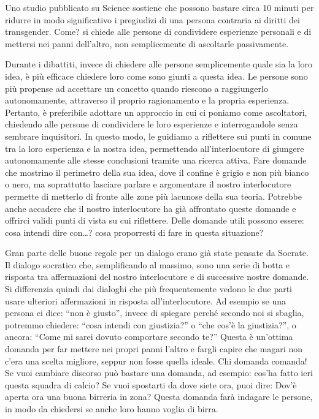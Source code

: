 \documentclass[12pt]{book} %
\begin{document}
Uno studio pubblicato su Science sostiene che
possono bastare circa 10 minuti per ridurre in modo significativo i pregiudizi di una persona contraria ai diritti dei transgender. Come? si chiede alle persone di condividere esperienze personali e di mettersi nei panni dell’altro, non semplicemente di ascoltarle passivamente.

Durante i dibattiti, invece di chiedere alle persone semplicemente quale sia la loro idea, è più efficace chiedere loro
come sono giunti a questa idea. Le persone sono più propense ad accettare un concetto quando riescono a raggiungerlo
autonomamente, attraverso il proprio ragionamento e la propria esperienza. Pertanto, è preferibile adottare un
approccio in cui ci poniamo come ascoltatori, chiedendo alle persone di condividere le loro esperienze e interrogandole
senza sembrare inquisitori. In questo modo, le guidiamo a riflettere sui punti in comune tra la loro esperienza e la
nostra idea, permettendo all'interlocutore di giungere autonomamente alle stesse conclusioni tramite una ricerca
attiva. Fare domande che mostrino il perimetro della sua idea, dove il confine è grigio e non più bianco o nero, ma
soprattutto lasciare parlare e argomentare il nostro interlocutore permette di metterlo di fronte alle zone più
lacunose della sua teoria. Potrebbe anche accadere che il
nostro interlocutore ha già affrontato queste domande e offrirci validi punti di vista su cui riflettere. Delle domande
utili possono essere: cosa intendi dire con…? cosa proporresti di fare in questa situazione?

Gran parte delle buone regole per un dialogo erano già state pensate da Socrate. Il dialogo socratico che, 
semplificando al massimo, sono una serie di botta e risposta tra affermazioni del nostro interlocutore e
di successive nostre domande. Si differenzia quindi dai dialoghi che più frequentemente vedono le due parti usare
ulteriori affermazioni in risposta all'interlocutore. Ad esempio se una persona ci dice: “non è
giusto”, invece di spiegare perché secondo noi si sbaglia, potremmo chiedere: “cosa intendi con giustizia?” o “che
cos'è la giustizia?”, o ancora: “Come mi sarei dovuto comportare secondo te?” Questa è
un'ottima domanda per far mettere nei propri panni l'altro e fargli capire
che magari non c'era una scelta migliore, seppur non fosse quella ideale.
Chi domanda comanda! Se vuoi cambiare discorso può bastare una domanda, ad esempio: cos'ha fatto ieri questa squadra di calcio?
Se vuoi spostarti da dove siete ora, puoi dire: Dov'è aperta ora una buona birreria in zona? Questa domanda farà indagare le persone, in modo da chiedersi se anche loro hanno voglia di birra.
\end{document}

